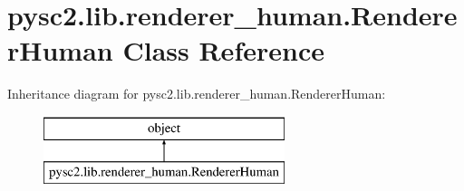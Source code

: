 \hypertarget{classpysc2_1_1lib_1_1renderer__human_1_1_renderer_human}{}\section{pysc2.\+lib.\+renderer\+\_\+human.\+Renderer\+Human Class Reference}
\label{classpysc2_1_1lib_1_1renderer__human_1_1_renderer_human}
Inheritance diagram for pysc2.\+lib.\+renderer\+\_\+human.\+Renderer\+Human\+:\begin{figure}[H]
\begin{center}
\leavevmode
\includegraphics[height=2.000000cm]{classpysc2_1_1lib_1_1renderer__human_1_1_renderer_human}
\end{center}
\end{figure}
